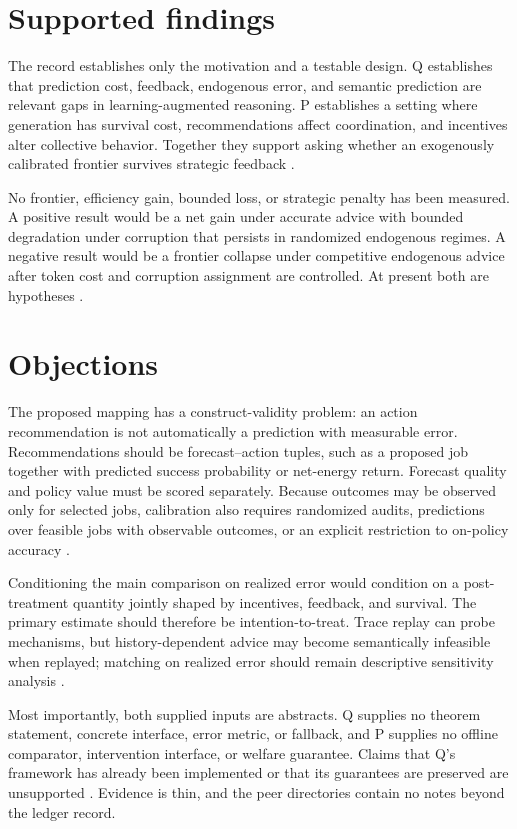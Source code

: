 \documentclass{article}
\begin{document}
\section{Supported findings}

The record establishes only the motivation and a testable design.  Q establishes that prediction cost, feedback, endogenous error, and semantic prediction are relevant gaps in learning-augmented reasoning.  P establishes a setting where generation has survival cost, recommendations affect coordination, and incentives alter collective behavior.  Together they support asking whether an exogenously calibrated frontier survives strategic feedback .

No frontier, efficiency gain, bounded loss, or strategic penalty has been measured.  A positive result would be a net gain under accurate advice with bounded degradation under corruption that persists in randomized endogenous regimes.  A negative result would be a frontier collapse under competitive endogenous advice after token cost and corruption assignment are controlled.  At present both are hypotheses .

\section{Objections}

The proposed mapping has a construct-validity problem: an action recommendation is not automatically a prediction with measurable error.  Recommendations should be forecast--action tuples, such as a proposed job together with predicted success probability or net-energy return.  Forecast quality and policy value must be scored separately.  Because outcomes may be observed only for selected jobs, calibration also requires randomized audits, predictions over feasible jobs with observable outcomes, or an explicit restriction to on-policy accuracy .

Conditioning the main comparison on realized error would condition on a post-treatment quantity jointly shaped by incentives, feedback, and survival.  The primary estimate should therefore be intention-to-treat.  Trace replay can probe mechanisms, but history-dependent advice may become semantically infeasible when replayed; matching on realized error should remain descriptive sensitivity analysis .

Most importantly, both supplied inputs are abstracts.  Q supplies no theorem statement, concrete interface, error metric, or fallback, and P supplies no offline comparator, intervention interface, or welfare guarantee.  Claims that Q's framework has already been implemented or that its guarantees are preserved are unsupported .  Evidence is thin, and the peer directories contain no notes beyond the ledger record.
\end{document}
